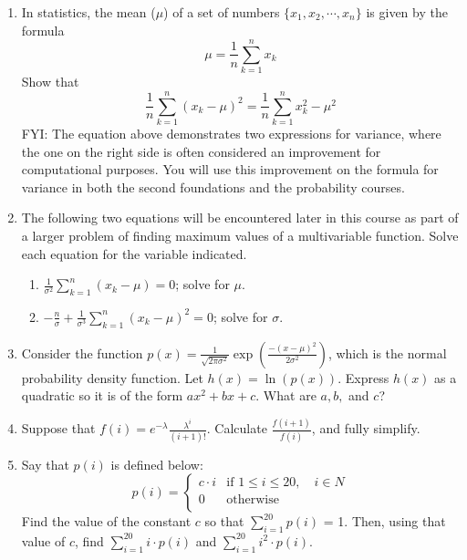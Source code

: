 \documentclass{article}
\begin{document}
                \begin{enumerate}
                    \item In statistics, the mean ($\mu$) of a set of numbers $\{x_1, x_2, \cdots, x_n\}$ is given by the formula $$\mu = \frac{1}{n}\sum_{k=1}^n x_k$$  Show that $$\frac{1}{n}\sum_{k=1}^n (x_k-\mu)^2 = \frac{1}{n}\sum_{k=1}^n x_k^2-\mu^2$$  FYI: The equation above demonstrates two expressions for variance, where the one on the right side is often considered an improvement for computational purposes.  You will use this improvement on the formula for variance in both the second foundations and the probability courses.
                    \item The following two equations will be encountered later in this course as part of a larger problem of finding maximum values of a multivariable function.  Solve each equation for the variable indicated. 
                       \begin{enumerate}
                           \item $\displaystyle \frac{1}{\sigma^2}\sum_{k=1}^{n}(x_k-\mu)=0$; solve for $\mu$.
                           \item $\displaystyle -\frac{n}{\sigma}+\frac{1}{\sigma^3}\sum_{k=1}^{n}(x_k-\mu)^2=0$; solve for $\sigma$.
                       \end{enumerate} 
                    \item Consider the function $\displaystyle p(x) = \frac{1}{\sqrt{2\pi \sigma^2}}\exp\left( \frac{-(x-\mu)^2}{2\sigma^2}\right)$, which is the normal probability density function.  Let $h(x) = \ln(p(x))$.  Express $h(x)$ as a quadratic so it is of the form $ax^2+bx+c$. What are $a,b,$ and $c$? 
                    \item Suppose that $\displaystyle f(i)= e^{-\lambda}\frac{\lambda^i}{(i+1)!}$.  Calculate $\displaystyle \frac{f(i+1)}{f(i)}$, and fully simplify.
                    \item Say that $p(i)$ is defined below:
                        $$ p(i) = \begin{cases} 
                        c\cdot i & \text{if $1 
                        \leq i \leq 20, \quad i \in N$} \\
                        0 & \text{otherwise} \\
                        \end{cases}
                        $$
                        Find the value of the constant $c$ so that $\displaystyle \sum_{i=1}^{20} p(i)$ = 1. Then, using that value of $c$, find $\displaystyle \sum_{i=1}^{20} i\cdot p(i)$ and $\displaystyle \sum_{i=1}^{20} i^2 \cdot p(i)$. 

\end{enumerate}
\end{document}
